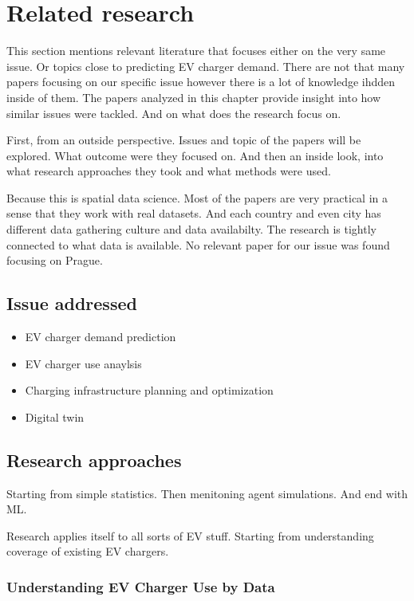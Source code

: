 \setchapterpreamble[u]{\margintoc}
\chapter{Related research}

This section mentions relevant literature that focuses either on the very same issue. Or topics close to predicting EV charger demand. There are not that many papers focusing on our specific issue however there is a lot of knowledge ihdden inside of them. The papers analyzed in this chapter provide insight into how similar issues were tackled. And on what does the research focus on.


First, from an outside perspective. Issues and topic of the papers will be explored. What outcome were they focused on. And then an inside look, into what research approaches they took and what methods were used.

Because this is spatial data science. Most of the papers are very practical in a sense that they work with real datasets. And each country and even city has different data gathering culture and data availabilty. The research is tightly connected to what data is available. No relevant paper for our issue was found focusing on Prague.


\section{Issue addressed}

\begin{itemize}
    \item EV charger demand prediction
    \item EV charger use anaylsis
    \item Charging infrastructure planning and optimization
    \item Digital twin
\end{itemize}

\section{Research approaches}

Starting from simple statistics. Then menitoning agent simulations. And end with ML.

Research applies itself to all sorts of EV stuff. Starting from understanding coverage of existing EV chargers.

\subsection{Understanding EV Charger Use by Data}

